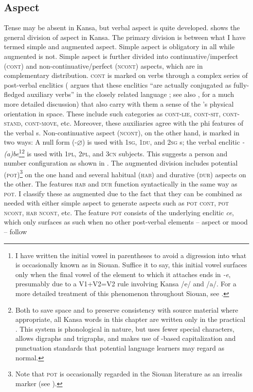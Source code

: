 \documentclass[output=paper]{LSP/langsci}
\begin{document}
\subsection{Aspect}
Tense may be absent in Kansa, but verbal aspect is quite developed.  shows the general division of aspect in Kansa. The primary division is between what I have termed simple and augmented aspect. Simple aspect is obligatory in all  while augmented is not. Simple aspect is further divided into continuative/imperfect (\textsc{cont}) and non-continuative/perfect (\textsc{ncont}) aspects, which are in complementary distribution. \textsc{cont} is marked on verbs through a complex series of post-verbal enclitics (\citet[485]{Rankin2005b} argues that these enclitics ``are actually conjugated as fully-fledged auxiliary verbs'' in the closely related  language ; see also \citet{Rankin2004positionals}, for a much more detailed discussion) that also carry with them a sense of the 's physical orientation in space. These include such categories as \textsc{cont-lie}, \textsc{cont-sit}, \textsc{cont-stand}, \textsc{cont-move}, etc. Moreover, these auxiliaries agree with the phi features of the verbal s. Non-continuative aspect (\textsc{ncont}), on the other hand, is marked in two ways: A null form (-$\varnothing$) is used with \textsc{1sg, 1du}, and \textsc{2sg} s; the verbal enclitic \textit{-(a)be}\footnote{I have written the initial vowel in parentheses to avoid a digression into what is occasionally known as  in Siouan. Suffice it to say, this initial vowel surfaces only when the final vowel of the element to which it attaches ends in \textit{-e}, presumably due to a V1+V2=V2 rule involving Kansa /e/ and /a/. For a more detailed treatment of this phenomenon throughout Siouan, see \citet{Rankin1995}.}\footnote{Both to save space and to preserve consistency with source material where appropriate, all Kansa words in this chapter are written only in the practical . This system is phonological in nature, but uses fewer special characters, allows digraphs and trigraphs, and makes use of -based capitalization and punctuation standards that potential language learners may regard as normal.} is used with \textsc{1pl, 2pl}, and \textsc{3cn} subjects. This suggests a person and number configuration as shown in . The augmented division includes potential (\textsc{pot})\footnote{Note that \textsc{pot} is occasionally regarded in the Siouan literature as an irrealis marker (see \citealt{Quintero2004,Quintero2009}).} on the one hand and several habitual (\textsc{hab}) and durative (\textsc{dur}) aspects on the other. The features \textsc{hab} and \textsc{dur} function syntactically in the same way as \textsc{pot}. I classify these as augmented due to the fact that they can be combined as needed with either simple aspect to generate  aspects such as \textsc{pot cont}, \textsc{pot ncont}, \textsc{hab ncont}, etc. The feature \textsc{pot} consists of the underlying enclitic \textit{ce}, which only surfaces as such when no other post-verbal elements -- aspect or mood -- follow 
\end{document}
